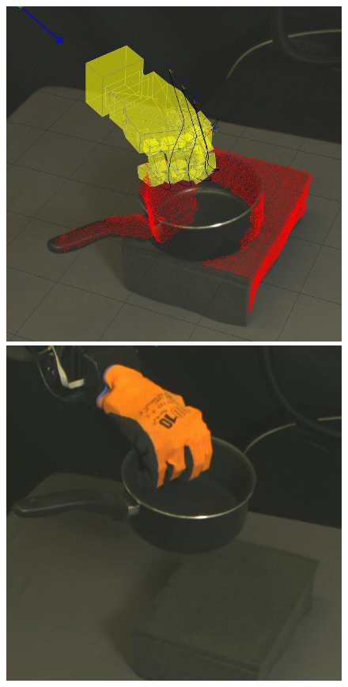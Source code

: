 \begin{figure}
\begin{center}
  \includegraphics[width=\tw]{images/experiments/query/saucepansmall-1-s} \hspace{-6pt}
 \includegraphics[width=\tw]{images/experiments/exec/saucepansmall-s}\\ [1ex]

\end{center}
\end{figure}
